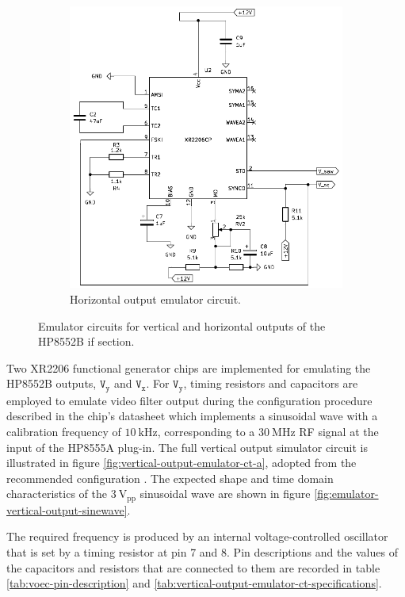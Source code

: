 \documentclass[class=report,11pt,crop=false]{standalone}
\begin{document}
\begin{figure}[h!]
\begin{subfigure}{.5\textwidth}
			\includegraphics[width=.8\linewidth]{Figures/Methodology/hp8552b-horizontal-output-emulator-3}
			\caption{Horizontal output emulator circuit.}
			\label{fig:horizontal-output-emulator-ct-a}
		\end{subfigure}
		\caption{Emulator circuits for vertical and horizontal outputs of the HP8552B \acrshort{if} section.}
		\label{fig:hp8552B-vh-emulator}
	\end{figure}
	
	Two XR2206 functional generator chips are implemented for emulating the HP8552B outputs, $\texttt{V}_\texttt{y}$ and $\texttt{V}_\texttt{x}$. For $\texttt{V}_\texttt{y}$, timing resistors and capacitors are employed to emulate video filter output during the configuration procedure described in the chip's datasheet which implements a sinusoidal wave with a calibration frequency of $\SI{10}{\kilo\hertz}$, corresponding to a $\SI{30}{\mega\hertz}$ RF signal at the input of the HP8555A plug-in. The full vertical output simulator circuit is illustrated in figure \ref{fig:vertical-output-emulator-ct-a}, adopted from the recommended configuration \cite{xr2206}. The expected shape and time domain characteristics of the $3~\text{V}_\text{pp}$ sinusoidal wave are shown in figure \ref{fig:emulator-vertical-output-sinewave}. 
	
		
	The required frequency is produced by an internal voltage-controlled oscillator that is set by a timing resistor at pin 7 and 8. Pin descriptions and the values of the capacitors and resistors that are connected to them are recorded in table \ref{tab:voec-pin-description} and \ref{tab:vertical-output-emulator-ct-specifications}.
	
\end{document}
